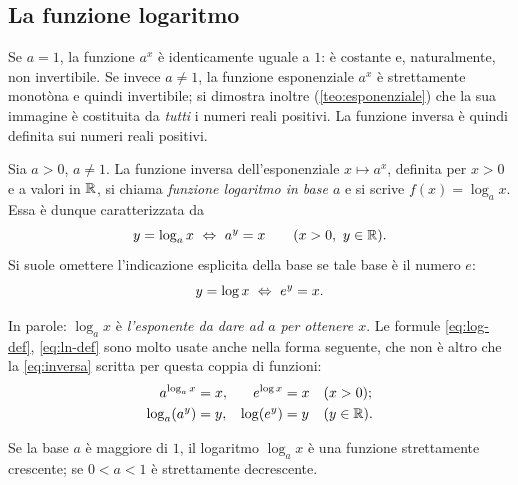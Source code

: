 \subsection{La funzione logaritmo}

Se $a=1$, la funzione $a^{x}$ è identicamente uguale a $1$: è costante e, naturalmente,
non invertibile. Se invece $a\neq1$, la funzione esponenziale $a^{x}$ è strettamente
monotòna e quindi invertibile; si dimostra inoltre (\cref{teo:esponenziale}) che la sua
immagine è costituita da \emph{tutti} i numeri reali positivi.
La funzione inversa è quindi definita sui numeri reali positivi.

\begin{definizione}[Logaritmo]
Sia $a>0$, $a\neq1$. La funzione inversa dell'esponenziale $x\mapsto a^{x}$, definita
per $x>0$ e a valori in $\mathbb{R}$, si chiama \emph{funzione logaritmo in base $a$} e si
scrive $f(x)=\log_{a}x$. Essa è dunque caratterizzata da
\begin{equation}\label{eq:log-def}
  y=\log_{a}x \ \Leftrightarrow\ a^{y}=x \qquad (x>0,\ y\in\mathbb{R}).
\end{equation}
Si suole omettere l'indicazione esplicita della base se tale base è il numero $e$:
\begin{equation}\label{eq:ln-def}
  y=\log x \ \Leftrightarrow\ e^{y}=x .
\end{equation}
\end{definizione}

In parole: $\log_{a}x$ è \emph{l'esponente da dare ad $a$ per ottenere $x$}. Le formule
\eqref{eq:log-def}, \eqref{eq:ln-def} sono molto usate anche nella forma seguente, che
non è altro che la \eqref{eq:inversa} scritta per questa coppia di funzioni:
\begin{equation}\label{eq:log-inversa}
\begin{aligned}
  a^{\log_{a}x}&=x, & e^{\log x}&=x & &(x>0); \\
  \log_{a}(a^{y})&=y, & \log(e^{y})&=y & &(y\in\mathbb{R}).
\end{aligned}
\end{equation}

\begin{proposizione}\label{prop:log-monotono}
Se la base $a$ è maggiore di $1$, il logaritmo $\log_{a}x$ è una funzione strettamente
crescente; se $0<a<1$ è strettamente decrescente.
\end{proposizione}

\begin{schema}
\end{schema}

